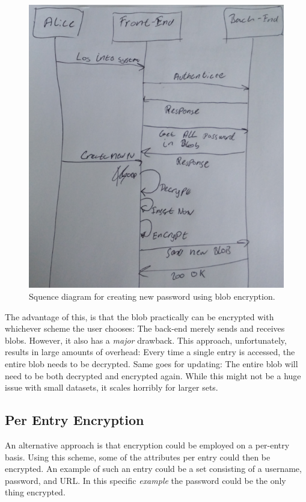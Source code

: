			\begin{figure}[h!]
				\centering
				\includegraphics[width=\textwidth]{figures/design/sequence_blob_small.png}
				\caption{Squence diagram for creating new password using blob encryption.}
				\label{fig:seq_blob}
			\end{figure}

			The advantage of this, is that the blob practically can be encrypted with whichever scheme the user chooses: The back-end merely sends and receives blobs. However, it also has a \emph{major} drawback. This approach, unfortunately, results in large amounts of overhead: Every time a single entry is accessed, the entire blob needs to be decrypted. Same goes for updating: The entire blob will need to be both decrypted and encrypted again. While this might not be a huge issue with small datasets, it scales horribly for larger sets.

		\subsection{Per Entry Encryption}
			An alternative approach is that encryption could be employed on a per-entry basis. Using this scheme, some of the attributes per entry could then be encrypted. An example of such an entry could be a set consisting of a username, password, and URL. In this specific \emph{example} the password could be the only thing encrypted. 

